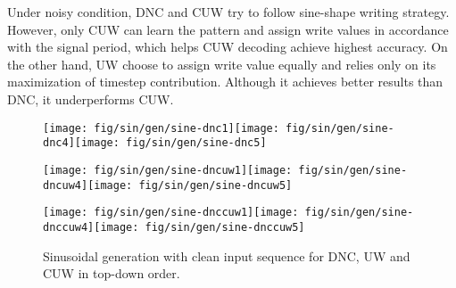 Under noisy condition, DNC and CUW try to follow sine-shape writing
strategy. However, only CUW can learn the pattern and assign write
values in accordance with the signal period, which helps CUW decoding
achieve highest accuracy. On the other hand, UW choose to assign write
value equally and relies only on its maximization of timestep contribution.
Although it achieves better results than DNC, it underperforms CUW. 

\begin{figure}
\begin{centering}
\noindent\begin{minipage}[t]{1\columnwidth}\texttt{[image: fig/sin/gen/sine-dnc1]}\texttt{[image: fig/sin/gen/sine-dnc4]}\texttt{[image: fig/sin/gen/sine-dnc5]}\end{minipage}
\par\end{centering}
\begin{centering}
\noindent\begin{minipage}[t]{1\columnwidth}\texttt{[image: fig/sin/gen/sine-dncuw1]}\texttt{[image: fig/sin/gen/sine-dncuw4]}\texttt{[image: fig/sin/gen/sine-dncuw5]}\end{minipage}
\par\end{centering}
\begin{centering}
\noindent\begin{minipage}[t]{1\columnwidth}\texttt{[image: fig/sin/gen/sine-dnccuw1]}\texttt{[image: fig/sin/gen/sine-dnccuw4]}\texttt{[image: fig/sin/gen/sine-dnccuw5]}\end{minipage}
\par\end{centering}
\caption{Sinusoidal generation with clean input sequence for DNC, UW and CUW
in top-down order. \label{fig:Sinusoid}}
\end{figure}

